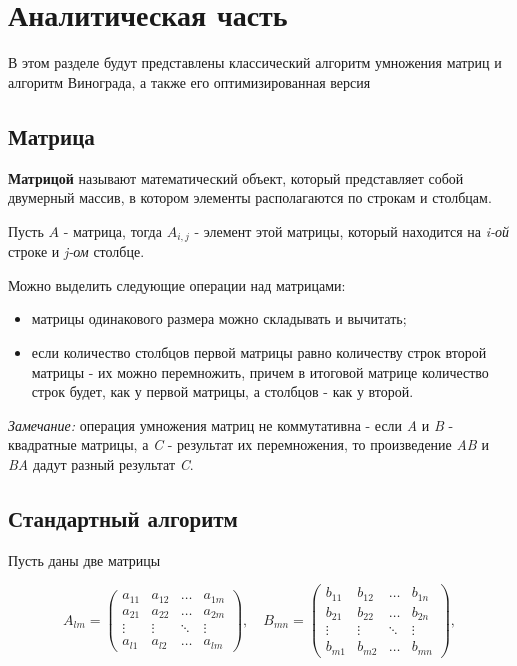 \chapter{Аналитическая часть}
В этом разделе будут представлены классический алгоритм умножения матриц и алгоритм Винограда, а также его оптимизированная версия


\section{Матрица}

\textbf{Матрицой} \cite{matrix} называют математический объект, который представляет собой двумерный массив, в котором элементы располагаются по строкам и столбцам.

Пусть $A$ - матрица, тогда $A_{i,j}$ - элемент этой матрицы, который находится на \textit{i-ой} строке и \textit{j-ом} столбце.

Можно выделить следующие операции над матрицами:
\begin{itemize}
    \item матрицы одинакового размера можно складывать и вычитать;
    \item если количество столбцов первой матрицы равно количеству строк второй матрицы - их можно перемножить, причем в итоговой матрице количество строк будет, как у первой матрицы, а столбцов - как у второй. \newline
\end{itemize}

\textit{Замечание:} операция умножения матриц не коммутативна - если \textit{A} и \textit{B} - квадратные матрицы, а \textit{C} - результат их перемножения, то произведение \textit{AB} и \textit{BA} дадут разный результат \textit{C}.


\section{Стандартный алгоритм}

Пусть даны две матрицы

\begin{equation}
	A_{lm} = \begin{pmatrix}
		a_{11} & a_{12} & \ldots & a_{1m}\\
		a_{21} & a_{22} & \ldots & a_{2m}\\
		\vdots & \vdots & \ddots & \vdots\\
		a_{l1} & a_{l2} & \ldots & a_{lm}
	\end{pmatrix},
	\quad
	B_{mn} = \begin{pmatrix}
		b_{11} & b_{12} & \ldots & b_{1n}\\
		b_{21} & b_{22} & \ldots & b_{2n}\\
		\vdots & \vdots & \ddots & \vdots\\
		b_{m1} & b_{m2} & \ldots & b_{mn}
	\end{pmatrix},
\end{equation}


